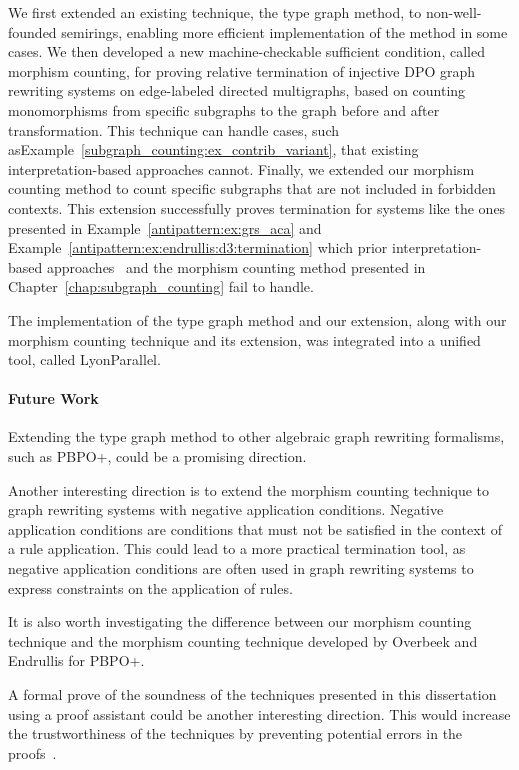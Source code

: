 \documentclass{report}
\begin{document}
We first extended an existing technique, the type graph method, to non-well-founded semirings, enabling more efficient implementation of the method in some cases.
We then developed a new machine-checkable sufficient condition, called morphism counting, for proving relative termination of injective DPO graph rewriting systems on edge-labeled directed multigraphs, based on counting monomorphisms from specific subgraphs to the graph before and after transformation. This technique can handle cases, such asExample~\ref{subgraph_counting:ex_contrib_variant}, that existing interpretation-based approaches cannot.
Finally, we extended our morphism counting method to count specific subgraphs that are not included in forbidden contexts. This extension successfully proves termination for systems like the ones presented
in Example~\ref{antipattern:ex:grs_aca} and Example~\ref{antipattern:ex:endrullis:d3:termination} which prior interpretation-based approaches~\cite{zantema2014termination,bruggink2014termination,bruggink2015proving,endrullis2024generalized_arxiv_v2,overbeek2024termination_lmcs} and the morphism counting method presented in Chapter~\ref{chap:subgraph_counting} fail to handle.

The implementation of the type graph method and our extension, along with our morphism counting technique and its extension, was integrated into a unified tool, called LyonParallel.
 
\paragraph{Future Work}

Extending the type graph method to other algebraic graph rewriting formalisms, such as PBPO+, could be a promising direction.

Another interesting direction is to extend the morphism counting technique to graph rewriting systems with negative application conditions. Negative application conditions are conditions that must not be satisfied in the context of a rule application. This could lead to a more practical termination tool, as negative application conditions are often used in graph rewriting systems to express constraints on the application of rules.

It is also worth investigating the difference between our morphism counting technique and
 the morphism counting technique developed by Overbeek and Endrullis for PBPO+. 
 
A formal prove of the soundness of the techniques presented in this dissertation using a proof assistant could be another interesting direction. This would increase the trustworthiness of the techniques by preventing potential errors in the proofs~\cite{contejean2004certified}.
\end{document}
